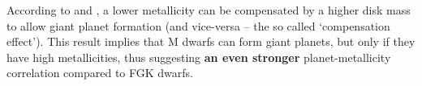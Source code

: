 \documentclass[structabstract]{aa}
\begin{document}
According to \citet{Thommes-2008} and \citet{Mordasini-2012}, a lower metallicity can be compensated by a higher disk mass to allow giant planet formation (and vice-versa -- the so called `compensation effect'). This result implies that M dwarfs can form giant planets, but only if they have high metallicities, thus suggesting \textbf{an even stronger} planet-metallicity correlation compared to FGK dwarfs. 











\end{document}
